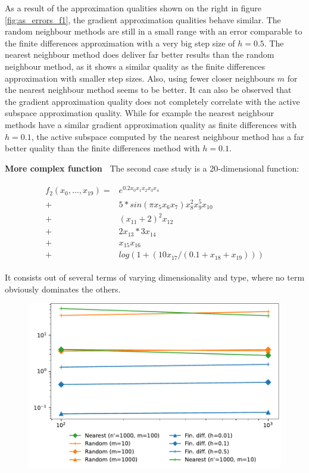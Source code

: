 \documentclass[
  a4paper,  %
  twoside,  %
  bibliography=totoc,
  headsepline,
  cleardoublepage=empty,
  parskip=half,
  draft=false
]{scrbook}
\begin{document}
As a result of the approximation qualities shown on the right in figure \cref{fig:as_errors_f1}, the gradient approximation qualities behave similar.
The random neighbour methods are still in a small range with an error comparable to the finite differences approximation with a very big step size of $h=0.5$.
The nearest neighbour method does deliver far better results than the random neighbour method, as it shows a similar quality as the finite differences approximation with smaller step sizes.
Also, using fewer closer neighbours $m$ for the nearest neighbour method seems to be better.
It can also be observed that the gradient approximation quality does not completely correlate with the active subspace approximation quality.
While for example the nearest neighbour methods have a similar gradient approximation quality as finite differences with $h=0.1$, the active subspace computed by the nearest neighbour method has a far better quality than the finite differences method with $h=0.1$.

\vspace{2mm}
\textbf{More complex function~}
The second case study is a 20-dimensional function:

\begin{align}
\begin{split}
f_2(x_0, \dots, x_{19})=&e^{0.2 x_0 x_1 x_2 x_3 x_4}\\
+ &5 * sin(\pi x_5 x_6 x_7) x_8^2 x_9^5 x_{10}\\
+ &(x_{11} + 2)^2 x_{12}\\
+ &2 x_{13} * 3 x_{14}\\
+ &x_{15} x_{16}\\
+ &log(1 + (10 x_{17} / (0.1 + x_{18} + x_{19})))
\end{split}
\end{align}

It consists out of several terms of varying dimensionality and type, where no term obviously dominates the others.

\begin{figure}[H]
\centering
	\includegraphics[width=\textwidth]{graphics/as_grad_errors_f2}
	\label{fig:as_grad_errors_f2}
\end{figure}
\end{document}
